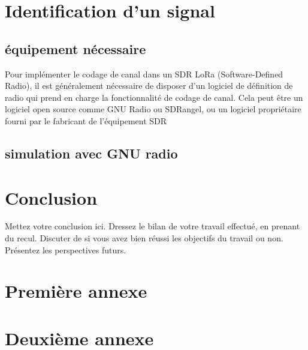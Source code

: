 \documentclass[12pt,a4paper,oneside, titlepage]{report}
\begin{document}
\chapter{Identification d'un signal}
\renewcommand{\leftmark}{CHAPITRE \thechapter.~~Titre Expérimentation de LoRa sur un SDR}

\section{équipement nécessaire}

Pour implémenter le codage de canal dans un SDR LoRa (Software-Defined Radio), il est généralement nécessaire de disposer d'un logiciel de définition de radio qui prend en charge la fonctionnalité de codage de canal. Cela peut être un logiciel open source comme GNU Radio ou SDRangel, ou un logiciel propriétaire fourni par le fabricant de l'équipement SDR

\section{simulation avec GNU radio}



\chapter*{Conclusion}
\renewcommand{\leftmark}{CONCLUSION}

Mettez votre conclusion ici.  Dressez le bilan de votre travail effectué, en prenant du recul. Discuter de si vous avez bien réussi les objectifs du travail ou non. Présentez les perspectives futurs.






\newpage
\appendix
{}

\chapter{Premi\`ere annexe}
\renewcommand{\leftmark}{ANNEXE \thechapter.~~Premi\`ere annexe}
\label{annexe1}

\chapter{Deuxi\`eme annexe}
\renewcommand{\leftmark}{ANNEXE \thechapter.~~Deuxi\`eme annexe}
\label{annexe2}

\end{document}
